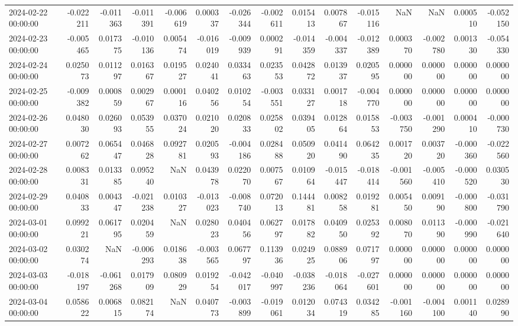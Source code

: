 \begin{tabular}{lrrrrrrrrrrrrrr}
2024-02-22 00:00:00 & -0.022211 & -0.011363 & -0.011391 & -0.006619 & 0.000337 & -0.026344 & -0.002611 & 0.015413 & 0.007867 & -0.015116 & NaN & NaN & 0.000510 & -0.052150 \\
2024-02-23 00:00:00 & -0.005465 & 0.017375 & -0.010136 & 0.005474 & -0.016019 & -0.009939 & 0.000291 & -0.014359 & -0.004337 & -0.012389 & 0.000370 & -0.002780 & 0.001330 & -0.054330 \\
2024-02-24 00:00:00 & 0.025073 & 0.011297 & 0.016367 & 0.019527 & 0.024041 & 0.033463 & 0.023553 & 0.042872 & 0.013937 & 0.020595 & 0.000000 & 0.000000 & 0.000000 & 0.000000 \\
2024-02-25 00:00:00 & -0.009382 & 0.000859 & 0.002967 & 0.000116 & 0.040256 & 0.010254 & -0.003551 & 0.033127 & 0.001718 & -0.004770 & 0.000000 & 0.000000 & 0.000000 & 0.000000 \\
2024-02-26 00:00:00 & 0.048030 & 0.026093 & 0.053955 & 0.037024 & 0.021020 & 0.020833 & 0.025802 & 0.039405 & 0.012864 & 0.015853 & -0.003750 & -0.001290 & 0.000410 & -0.000730 \\
2024-02-27 00:00:00 & 0.007262 & 0.065447 & 0.046828 & 0.092781 & 0.020593 & -0.004186 & 0.028488 & 0.050920 & 0.041490 & 0.064235 & 0.001720 & 0.003720 & -0.000360 & -0.022560 \\
2024-02-28 00:00:00 & 0.008331 & 0.013385 & 0.095240 & NaN & 0.043978 & 0.022070 & 0.007567 & 0.010964 & -0.015447 & -0.018414 & -0.001560 & -0.005410 & -0.000520 & 0.030530 \\
2024-02-29 00:00:00 & 0.040833 & 0.004347 & -0.021238 & 0.010327 & -0.013023 & -0.008740 & 0.072013 & 0.144481 & 0.008258 & 0.019281 & 0.005450 & 0.009190 & -0.000800 & -0.031790 \\
2024-03-01 00:00:00 & 0.099221 & 0.061795 & 0.020459 & NaN & 0.028023 & 0.040456 & 0.062797 & 0.017882 & 0.040950 & 0.025392 & 0.008070 & 0.011390 & -0.000990 & -0.021640 \\
2024-03-02 00:00:00 & 0.030274 & NaN & -0.006293 & 0.018638 & -0.003565 & 0.067797 & 0.113936 & 0.024925 & 0.088906 & 0.071797 & 0.000000 & 0.000000 & 0.000000 & 0.000000 \\
2024-03-03 00:00:00 & -0.018197 & -0.061268 & 0.017909 & 0.080929 & 0.019254 & -0.042017 & -0.040997 & -0.038236 & -0.018064 & -0.027601 & 0.000000 & 0.000000 & 0.000000 & 0.000000 \\
2024-03-04 00:00:00 & 0.058622 & 0.006815 & 0.082174 & NaN & 0.040773 & -0.003899 & -0.019061 & 0.012034 & 0.074319 & 0.034285 & -0.001160 & -0.004100 & 0.001140 & 0.028990 \\

\end{tabular}
